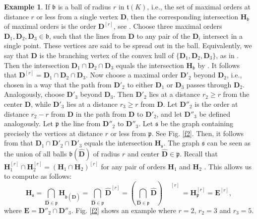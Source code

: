 \documentclass{amsart}
\theoremstyle{definition}
\newtheorem{example}[theorem]{Example}
\newcommand\Da{\mathbf{D}}
\newcommand\Ha{\mathbf{H}}
\newcommand\Ea{\mathbf{E}}
\begin{document}
\begin{example}\label{e24}
    If $\mathfrak{b}$ is a ball of radius $r$ in 
    $\mathfrak{t}(K)$, i.e., the set of maximal orders
    at distance $r$ or less from a single vertex $\Da$,
    then the corresponding intersection $\Ha_{\mathfrak{b}}$
    of maximal orders is the order $\Da^{[r]}$, see 
    \cite[Lem. 2.5]{Eichler2}. Choose
    three maximal orders $\Da_1,\Da_2,\Da_3\in
    \mathfrak{b}$, such that the lines from $\Da$ 
    to any pair of the 
    $\Da_i$ intersect in a single point. These vertices
    are said to be spread out in the ball. 
    Equivalently, we say that
    $\Da$ is the branching vertex
    of the convex hull of $\{\Da_1,
    \Da_2,\Da_3\}$, as in 
    \cite[Def. 11]{Tu}.
    Then the intersection $\Da_1\cap\Da_2\cap\Da_3$
    equals the intersection $\Ha_{\mathfrak{b}}$
    by \cite[Thm. 8]{Tu}. It follows that 
    $\Da^{[r]}=\Da_1\cap\Da_2\cap\Da_3$.
    Now choose a maximal order $\Da'_2$
    beyond $\Da_2$, i.e., chosen in a way
    that the path from $\Da'_2$ to either
    $\Da_1$ or $\Da_3$ passes through $\Da_2$. Analogously, choose
    $\Da'_3$ beyond $\Da_3$.
    Then $\Da'_2$ lies at a distance
    $r_2\geq r$ from  the center $\Da$, while
    $\Da'_3$ lies at a distance
    $r_3\geq r$ from $\Da$. Let $\Da''_2$
     is the order at distance $r_2-r$ from $\Da$
     in the path from $\Da$ to $\Da'_2$, and let
     $\Da''_3$ be defined analogously. 
     Let $\mathfrak{p}$ the line from $\Da''_2$ to $\Da''_3$.
     Let $\mathfrak{s}$ be the graph containing
     precisely the vertices at distance $r$ or less from 
     $\mathfrak{p}$. See Fig. \ref{f2}.
     Then, it follows from \cite[Thm. 8]{Tu}
     that $\Da_1\cap\Da'_2\cap\Da'_3$ equals the intersection
     $\Ha_{\mathfrak{s}}$. The graph $\mathfrak{s}$
     can be seen as the union of all balls 
     $\mathfrak{b}(\hat{\Da})$ of radius $r$ and center
     $\hat{\Da}\in\mathfrak{p}$.  Recall that $\Ha_1^{[r]}\cap
     \Ha_2^{[r]}=(\Ha_1\cap\Ha_2)^{[r]}$ for any pair of orders
     $\Ha_1$ and $\Ha_2$ \cite[Prop. 2.1]{Eichler2}. This allows us to compute
     as follows:
     $$\Ha_{\mathfrak{s}}=\bigcap_{\hat{\Da}\in\mathfrak{p}}
     \Ha_{\mathfrak{b}(\hat{\Da})}=
     \bigcap_{\hat{\Da}\in\mathfrak{p}}
     \hat{\Da}^{[r]}=
     \left(\bigcap_{\hat{\Da}\in\mathfrak{p}}
     \hat{\Da}\right)\!\!\!\!\!\!\!\!
     {\phantom{\int}}^{[r]}=
     \Ha_{\mathfrak{p}}^{[r]}=\Ea^{[r]},$$
     where $\Ea=\Da''_2\cap\Da''_3$.
     Fig. \ref{f2} shows an example 
     where $r=2$, $r_2=3$ and $r_3=5$. 
\end{example}
\end{document}
